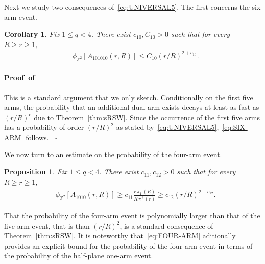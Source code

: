 \documentclass[a4paper,oneside,11pt]{article}
\newtheorem{corollary}[theorem]{Corollary}
\newtheorem{proposition}[theorem]{Proposition}
\numberwithin{equation}{section}
\numberwithin{equation}{section}
\numberwithin{equation}{section}
\newenvironment{proof}[1][\relax]%
  {\paragraph{Proof\ifx#1\relax\else~of #1\fi}}%
  {~\hfill$\square$\par\bigskip}
\newcommand{\bbZ}{\mathbb{Z}}
\begin{document}
Next we study two consequences of~\eqref{eq:UNIVERSAL5}. The first concerns the six arm event. 

\begin{corollary}\label{cor:six arm}
  Fix  $1\le q< 4$. There exist $c_{10},C_{10}>0$ such that for every $R\ge r\ge 1$,
  \begin{align} &\phi_{\bbZ^2}[A_{101010}(r,R)] \le C_{10}\left(r/R\right)^{2+c_{10}}.\label{eq:SIX-ARM}
   \end{align}
\end{corollary} 

\begin{proof}
	This is a standard argument that we only sketch. 
	Conditionally on the first five arms, the probability that an additional dual arm exists decays at least as fast as  $(r/R)^c$ due to Theorem~\ref{thm:sRSW}. 
	Since the occurrence of the first five arms has a probability of  order $(r/R)^2$ as stated by~\eqref{eq:UNIVERSAL5},~\eqref{eq:SIX-ARM} follows. 
\end{proof} 

We now turn to an estimate on the probability of the four-arm event.
\begin{proposition}\label{prop:four arm}
  Fix  $1\le q< 4$. There exist $c_{11},c_{12}>0$ such that for every $R\ge r\ge 1$,
  \begin{align}
 &\phi_{\bbZ^2}[A_{1010}(r,R)]\ge   c_{11}\tfrac{r\, \pi_1^+(R)}{R\, \pi_1^+(r)}\ge c_{12}(r/R)^{2-c_{12}} \label{eq:FOUR-ARM}.
  \end{align}
\end{proposition} 

That the probability of the four-arm event is polynomially larger than that of the five-arm event, that is than $(r/R)^2$, is a standard consequence of Theorem~\ref{thm:sRSW}. 
It is noteworthy that~\eqref{eq:FOUR-ARM} aditionally provides an explicit bound for the probability of the four-arm event 
in terms of the probability of the half-plane one-arm event.
\end{document}
